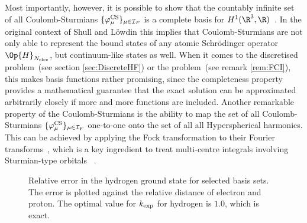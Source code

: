 Most importantly, however, it is possible to show
that the countably infinite set of all Coulomb-Sturmians $\{\varphi^\text{CS}_\mu\}_{\mu\in\mathcal{I}_F}$
is a complete basis for $H^1(\R^3, \R)$~\cite[Theorem 2.3.4]{Avery2008}.
In the original context of Shull and Löwdin this implies that Coulomb-Sturmians
are not only able to represent the bound states
of any atomic Schrödinger operator $\Op{H}_{\Nelec}$,
but continuum-like states as well.
When it comes to the discretised \HF problem~(see section \ref{sec:DiscreteHF})
or the \FCI problem~(see remark \ref{rem:FCI}),
this makes \CS basis functions rather promising,
since the completeness property
provides a mathematical guarantee that the exact solution can be approximated
arbitrarily closely
if more and more \CS functions are included.
Another remarkable property of the Coulomb-Sturmians
is the ability to map the set of all Coulomb-Sturmians
$\{ \varphi^\text{CS}_\mu\}_{\mu\in\mathcal{I}_F}$
one-to-one onto the set of all all Hyperspherical harmonics.
This can be achieved by applying the Fock transformation
to their Fourier transforms~\cite{Avery2006},
which is a key ingredient to treat multi-centre integrals
involving Sturmian-type orbitals%
~\cite{Aquilanti1996,Aquilanti1997,Aquilanti2001,Morales2016,Avery2015,Avery2017}.

\begin{figure}[t]
	\centering
	\caption[
		Relative error in the hydrogen ground state
		for selected \CS basis sets
	]
	{Relative error in the hydrogen ground state
		for selected \CS basis sets.
		The error is plotted against
		the relative distance of electron and proton.
		The optimal value for $k_\text{exp}$ for hydrogen is $1.0$,
		which is exact.
	}
	\label{fig:RelativeErrorCS}
\end{figure}

